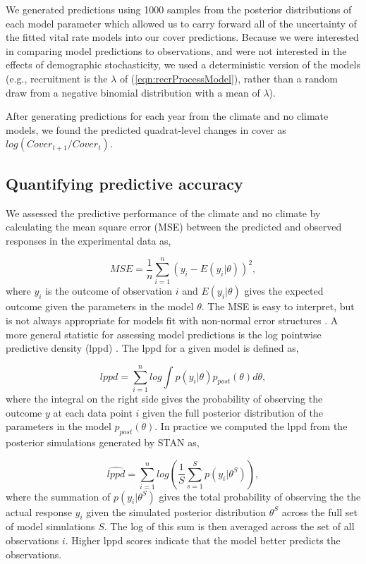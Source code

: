 \documentclass[11pt]{article}
\begin{document}
\begin{doublespace}
We generated predictions using 1000 samples from the posterior distributions of each model parameter which allowed us to carry forward all of the uncertainty of the fitted vital rate models into our cover predictions. Because we were interested in comparing model predictions to observations, and were not interested in the effects of demographic stochasticity, we used a deterministic version of the models (e.g., recruitment is the $\lambda$ of (\ref{eqn:recrProcessModel}), rather than a random draw from a negative binomial distribution with a mean of $\lambda$).

After generating predictions for each year from the climate and no climate models, we found the predicted quadrat-level changes in cover as $log(Cover_{t+1}/Cover_{t})$.

\subsection*{Quantifying predictive accuracy} 
We assessed the predictive performance of the climate and no climate by calculating the mean square error (MSE) between the predicted and observed responses in the experimental data as, 

\begin{equation}
MSE = \frac{1}{n} \sum_{i=1}^{n} (y_i - E(y_i|\theta))^2, 
\label{eqn:MSE}
\end{equation}
where $y_i$ is the outcome of observation $i$ and $E(y_i|\theta)$ gives the expected outcome given the parameters in the model $\theta$. The MSE is easy to interpret, but is not always appropriate for models fit with non-normal error structures \citep{gelman_understanding_2014}. A more general statistic for assessing model predictions is the log pointwise predictive density (lppd) \citep{gelman_understanding_2014}. The lppd for a given model is defined as, 

\begin{equation}
lppd = \sum_{i=1}^{n} log \int p(y_i| \theta)p_{post}(\theta) d\theta, 
\label{eqn:lppd}
\end{equation}
where the integral on the right side gives the probability of observing the outcome $y$ at each data point $i$ given the full posterior distribution of the parameters in the model $p_{post}(\theta)$. In practice we computed the lppd from the posterior simulations generated by STAN as, 

\begin{equation}
\widehat{lppd} = \sum_{i=1}^{n} log \left(\frac{1}{S} \sum_{s=1}^{S} p(y_i | \theta^S) \right),
\label{eqn:clppd}
\end{equation}
where the summation of $p(y_i|\theta^S)$ gives the total probability of observing the the actual response $y_i$ given the simulated posterior distribution $\theta^S$ across the full set of model simulations $S$.  The log of this sum is then averaged across the set of all observations $i$.  Higher lppd scores indicate that the model better predicts the observations.


\end{doublespace}
\end{document}
